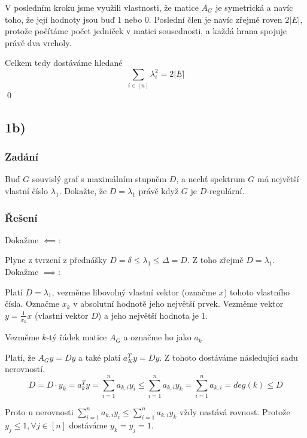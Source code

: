 \documentclass[../main.tex]{subfiles}
\begin{document}
V posledním kroku jsme využili vlastnosti, že matice $A_G$ je symetrická a navíc toho, že její hodnoty jsou buď 1 nebo 0. 
Poslední člen je navíc zřejmě roven $2|E|$, protože počítáme počet jedniček v matici sousednosti, a každá hrana spojuje právě dva vrcholy.  

Celkem tedy dostáváme hledané 
\begin{equation*}
    \sum_{i\in[n]} \lambda_i^2 = 2|E|
\end{equation*}
\qed 


\subsection{1b)}
\subsubsection*{Zadání}

Buď $G$ souvislý graf s maximálním stupněm $D$, a nechť spektrum $G$ má největší vlastní číslo $\lambda_1$. Dokažte, že $D=\lambda_1$ právě když $G$ je $D$-regulární.  

\subsubsection*{Řešení}

Dokažme $\impliedby$: 

Plyne z tvrzení z přednášky $D = \delta \leq \lambda_1 \leq \Delta = D$. Z toho zřejmě $D = \lambda_1$.\\
Dokažme $\implies$: 

Platí $D=\lambda_1$, vezměme libovolný vlastní vektor (označme $x$) tohoto vlastního čísla. Označme $x_k$ v absolutní hodnotě jeho největší prvek.
Vezměme vektor $y = \frac{1}{x_k}x$ (vlastní vektor $D$) a jeho největší hodnota je 1.

Vezměme $k$-tý řádek matice $A_G$ a označme ho jako $a_k$

Platí, že $A_G y = D y$ a také platí $a_K^T y = D y$. Z tohoto dostáváme následující sadu nerovností.
\begin{equation*}
    D = D \cdot y_k = a_k^T y = \sum_{i=1}^n a_{k,i}y_i \leq \sum_{i=1}^n a_{k,i} y_k = \sum_{i=1}^n a_{k,i} = deg(k) \leq D 
\end{equation*}

Proto u nerovnosti $\sum_{i=1}^n a_{k,i}y_i \leq \sum_{i=1}^n a_{k,i} y_k$ vždy nastává rovnost. Protože  $y_j \leq 1, \forall j\in[n]$ dostáváme $y_k = y_j = 1$.
\end{document}
